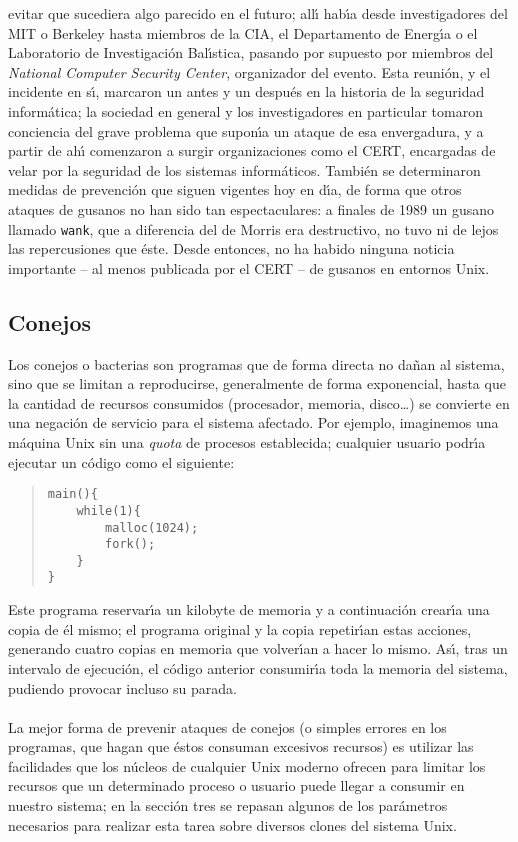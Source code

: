 evitar que sucediera algo parecido en el futuro; all\'{\i} hab\'{\i}a 
desde investigadores del MIT o Berkeley hasta miembros de la CIA, el 
Departamento de Energ\'{\i}a o el Laboratorio de Investigaci\'on Bal\'{\i}stica,
pasando por supuesto por miembros del {\it National Computer Security Center},
organizador del evento. Esta reuni\'on, y el incidente en s\'{\i}, marcaron un
antes y un despu\'es en la historia de la seguridad inform\'atica; la 
sociedad en general y los investigadores en particular tomaron conciencia del
grave problema que supon\'{\i}a un ataque de esa envergadura, y a partir de
ah\'{\i} comenzaron a surgir organizaciones como el CERT, encargadas de velar
por la seguridad de los sistemas inform\'aticos. Tambi\'en se determinaron
medidas de prevenci\'on que siguen vigentes hoy en d\'{\i}a, de forma que otros
ataques de gusanos no han sido tan espectaculares: a finales de 1989 un gusano
llamado {\tt wank}, que a diferencia del de Morris era destructivo, no tuvo
ni de lejos las repercusiones que \'este. Desde entonces, no ha habido ninguna
noticia importante -- al menos publicada por el CERT -- de gusanos en entornos
Unix.
\subsection{Conejos}
Los conejos o bacterias son programas que de forma directa no da\~nan al 
sistema, 
sino que se limitan a reproducirse, generalmente de forma exponencial, hasta 
que la cantidad de recursos consumidos (procesador, memoria, disco\ldots) se 
convierte en una negaci\'on de servicio para el sistema afectado. Por ejemplo,
imaginemos una m\'aquina Unix sin una {\it quota} de procesos establecida; 
cualquier usuario podr\'{\i}a ejecutar un c\'odigo como el siguiente:
\tt
\begin{quote}
\begin{verbatim}
main(){
    while(1){
        malloc(1024);
        fork();
    }
}    
\end{verbatim}
\end{quote}
\rm
Este programa reservar\'{\i}a un kilobyte de memoria y a continuaci\'on 
crear\'{\i}a una copia de \'el mismo; el programa original y la copia 
repetir\'{\i}an estas acciones, generando cuatro copias en memoria que 
volver\'{\i}an a hacer lo mismo. As\'{\i}, tras un intervalo de ejecuci\'on, 
el c\'odigo anterior consumir\'{\i}a toda la memoria del sistema, pudiendo 
provocar incluso su parada.\\
\\La mejor forma de prevenir ataques de conejos (o simples errores en los
programas, que hagan que \'estos consuman excesivos recursos) es utilizar las
facilidades que los n\'ucleos de cualquier Unix moderno ofrecen para limitar
los recursos que un determinado proceso o usuario puede llegar a consumir en
nuestro sistema; en la secci\'on tres se repasan algunos de los
par\'ametros necesarios para realizar esta tarea sobre diversos clones del 
sistema Unix.
